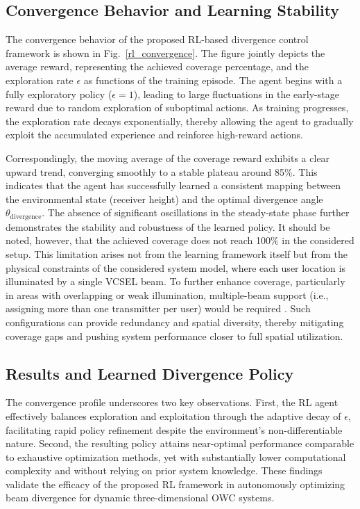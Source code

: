 \documentclass[twocolumn,twoside]{IEEEtran}
\theoremstyle{break}
\begin{document}
\subsection{Convergence Behavior and Learning Stability}
The convergence behavior of the proposed RL-based divergence control framework is shown in Fig.~\ref{rl_convergence}. The figure jointly depicts the average reward, representing the achieved coverage percentage, and the exploration rate $\epsilon$ as functions of the training episode. The agent begins with a fully exploratory policy ($\epsilon = 1$), leading to large fluctuations in the early-stage reward due to random exploration of suboptimal actions. As training progresses, the exploration rate decays exponentially, thereby allowing the agent to gradually exploit the accumulated experience and reinforce high-reward actions.

Correspondingly, the moving average of the coverage reward exhibits a clear upward trend, converging smoothly to a stable plateau around 85\%. This indicates that the agent has successfully learned a consistent mapping between the environmental state (receiver height) and the optimal divergence angle $\theta_{\text{divergence}}$. The absence of significant oscillations in the steady-state phase further demonstrates the stability and robustness of the learned policy. It should be noted, however, that the achieved coverage does not reach 100\% in the considered setup. This limitation arises not from the learning framework itself but from the physical constraints of the considered system model, where each user location is illuminated by a single VCSEL beam. To further enhance coverage, particularly in areas with overlapping or weak illumination, multiple-beam support (i.e., assigning more than one transmitter per user) would be required \cite{safi3d}. Such configurations can provide redundancy and spatial diversity, thereby mitigating coverage gaps and pushing system performance closer to full spatial utilization.
\vspace{-3mm}
\subsection{Results and Learned Divergence Policy }

The convergence profile underscores two key observations. First, the RL agent effectively balances exploration and exploitation through the adaptive decay of $\epsilon$, facilitating rapid policy refinement despite the environment’s non-differentiable nature. Second, the resulting policy attains near-optimal performance comparable to exhaustive optimization methods, yet with substantially lower computational complexity and without relying on prior system knowledge. These findings validate the efficacy of the proposed RL framework in autonomously optimizing beam divergence for dynamic three-dimensional OWC systems.
\end{document}
